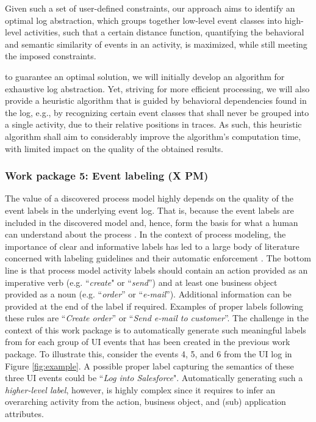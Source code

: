 Given such a set of user-defined constraints, our approach aims to identify an optimal log abstraction, which groups together low-level event classes into high-level activities, such that a certain distance function, quantifying the behavioral and semantic similarity of events in an activity, is maximized, while still meeting the imposed constraints.

to guarantee an optimal solution, we will initially develop an algorithm for exhaustive log abstraction. Yet, striving for more efficient processing, we will also provide a heuristic algorithm that is guided by behavioral dependencies found in the log, e.g., by recognizing certain event classes that shall never be grouped into a single activity, due to their relative positions in traces.
As such, this heuristic algorithm shall aim to considerably improve the algorithm's computation time, with limited impact on the quality of the obtained results.



\subsubsection{Work package 5: Event labeling (X PM)}
\label{sec:wp5}

The value of a discovered process model highly depends on the quality of the event labels in the underlying event log. That is, because the event labels are included in the discovered model and, hence, form the basis for what a human can understand about the process \cite{mendling2010activity,Leopold2013Book}. In the context of process modeling, the importance of clear and informative labels has led to a large body of literature concerned with labeling guidelines \cite{mendling2010seven,leopold2015learning} and their automatic enforcement \cite{leopold2013detection,becker2009towards}. The bottom line is that process model activity labels should contain an action provided as an imperative verb (e.g. ``\textit{create}" or ``\textit{send}'') and at least one business object provided as a noun (e.g. ``\textit{order}'' or ``\textit{e-mail}''). Additional information can be provided at the end of the label if required. Examples of proper labels following these rules are ``\textit{Create order}'' or ``\textit{Send e-mail to customer}''. The challenge in the context of this work package is to automatically generate such meaningful labels from for each group of UI events that has been created in the previous work package. To illustrate this, consider the events 4, 5, and 6 from the UI log in Figure \ref{fig:example}. A possible proper label capturing the semantics of these three UI events could be ``\textit{Log into Salesforce}". Automatically generating such a \textit{higher-level label}, however, is highly complex since it requires to infer an overarching activity from the action, business object, and (sub) application attributes.

